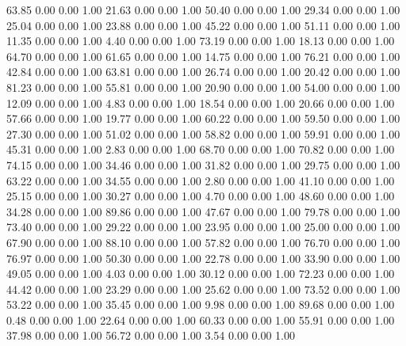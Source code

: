    63.85   0.00   0.00   1.00
   21.63   0.00   0.00   1.00
   50.40   0.00   0.00   1.00
   29.34   0.00   0.00   1.00
   25.04   0.00   0.00   1.00
   23.88   0.00   0.00   1.00
   45.22   0.00   0.00   1.00
   51.11   0.00   0.00   1.00
   11.35   0.00   0.00   1.00
    4.40   0.00   0.00   1.00
   73.19   0.00   0.00   1.00
   18.13   0.00   0.00   1.00
   64.70   0.00   0.00   1.00
   61.65   0.00   0.00   1.00
   14.75   0.00   0.00   1.00
   76.21   0.00   0.00   1.00
   42.84   0.00   0.00   1.00
   63.81   0.00   0.00   1.00
   26.74   0.00   0.00   1.00
   20.42   0.00   0.00   1.00
   81.23   0.00   0.00   1.00
   55.81   0.00   0.00   1.00
   20.90   0.00   0.00   1.00
   54.00   0.00   0.00   1.00
   12.09   0.00   0.00   1.00
    4.83   0.00   0.00   1.00
   18.54   0.00   0.00   1.00
   20.66   0.00   0.00   1.00
   57.66   0.00   0.00   1.00
   19.77   0.00   0.00   1.00
   60.22   0.00   0.00   1.00
   59.50   0.00   0.00   1.00
   27.30   0.00   0.00   1.00
   51.02   0.00   0.00   1.00
   58.82   0.00   0.00   1.00
   59.91   0.00   0.00   1.00
   45.31   0.00   0.00   1.00
    2.83   0.00   0.00   1.00
   68.70   0.00   0.00   1.00
   70.82   0.00   0.00   1.00
   74.15   0.00   0.00   1.00
   34.46   0.00   0.00   1.00
   31.82   0.00   0.00   1.00
   29.75   0.00   0.00   1.00
   63.22   0.00   0.00   1.00
   34.55   0.00   0.00   1.00
    2.80   0.00   0.00   1.00
   41.10   0.00   0.00   1.00
   25.15   0.00   0.00   1.00
   30.27   0.00   0.00   1.00
    4.70   0.00   0.00   1.00
   48.60   0.00   0.00   1.00
   34.28   0.00   0.00   1.00
   89.86   0.00   0.00   1.00
   47.67   0.00   0.00   1.00
   79.78   0.00   0.00   1.00
   73.40   0.00   0.00   1.00
   29.22   0.00   0.00   1.00
   23.95   0.00   0.00   1.00
   25.00   0.00   0.00   1.00
   67.90   0.00   0.00   1.00
   88.10   0.00   0.00   1.00
   57.82   0.00   0.00   1.00
   76.70   0.00   0.00   1.00
   76.97   0.00   0.00   1.00
   50.30   0.00   0.00   1.00
   22.78   0.00   0.00   1.00
   33.90   0.00   0.00   1.00
   49.05   0.00   0.00   1.00
    4.03   0.00   0.00   1.00
   30.12   0.00   0.00   1.00
   72.23   0.00   0.00   1.00
   44.42   0.00   0.00   1.00
   23.29   0.00   0.00   1.00
   25.62   0.00   0.00   1.00
   73.52   0.00   0.00   1.00
   53.22   0.00   0.00   1.00
   35.45   0.00   0.00   1.00
    9.98   0.00   0.00   1.00
   89.68   0.00   0.00   1.00
    0.48   0.00   0.00   1.00
   22.64   0.00   0.00   1.00
   60.33   0.00   0.00   1.00
   55.91   0.00   0.00   1.00
   37.98   0.00   0.00   1.00
   56.72   0.00   0.00   1.00
    3.54   0.00   0.00   1.00
